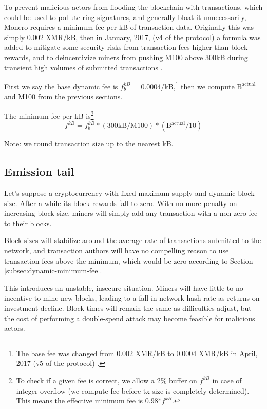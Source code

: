 To prevent malicious actors from flooding the blockchain with transactions, which could be used to pollute ring signatures, and generally bloat it unnecessarily, Monero requires a minimum fee per kB of transaction data. Originally this was simply 0.002 XMR/kB, then in January, 2017, (v4 of the protocol) a formula was added to mitigate some security risks from transaction fees higher than block rewards, and to deincentivize miners from pushing M100 above 300kB during transient high volumes of submitted transactions \cite{dynamic-per-kb-fee}.

First we say the base dynamic fee is $f^{kB}_b$ = 0.0004/kB,\footnote{The base fee was changed from 0.002 XMR/kB to 0.0004 XMR/kB in April, 2017 (v5 of the protocol) \cite{monero-v5}.} then we compute $\textrm{B}^{\textrm{actual}}$ and M100 from the previous sections.

The minimum fee per kB is\footnote{To check if a given fee is correct, we allow a 2\% buffer on $f^{kB}$ in case of integer overflow (we compute fee before tx size is completely determined). This means the effective minimum fee is 0.98*$f^{kB}$.}\vspace{.1cm}
\[ f^{kB} = f^{kB}_b*(\textrm{300kB}/\textrm{M100})*(\textrm{B}^{\textrm{actual}}/10) \]

Note: we round transaction size up to the nearest kB.


\subsection{Emission tail}
\label{subsec:emission-tail}

Let's suppose a cryptocurrency with fixed maximum supply and dynamic block size. After a while its block rewards fall to zero. With no more penalty on increasing block size, miners will simply add any transaction with a non-zero fee to their blocks. 

Block sizes will stabilize around the average rate of transactions submitted to the network, and transaction authors will have no compelling reason to use transaction fees above the minimum, which would be zero according to Section \ref{subsec:dynamic-minimum-fee}. 

This introduces an unstable, insecure situation. Miners will have little to no incentive to mine new blocks, leading to a fall in network hash rate as returns on investment decline. Block times will remain the same as difficulties adjust, but the cost of performing a double-spend attack may become feasible for malicious actors.\\
        
